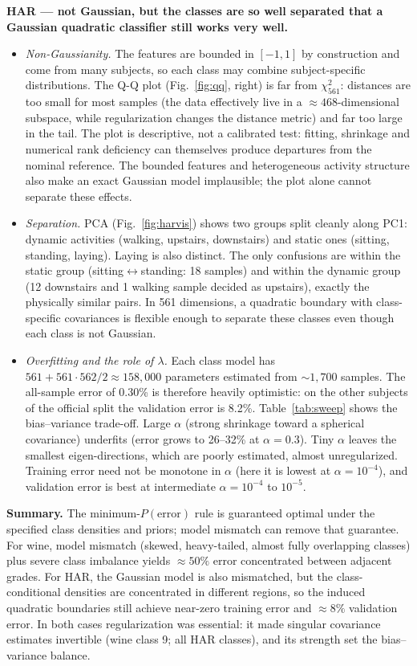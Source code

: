 \documentclass[10pt]{article}
\begin{document}
\textbf{HAR --- not Gaussian, but the classes are so well separated that a Gaussian quadratic classifier still works very well.}
\begin{itemize}
\item \emph{Non-Gaussianity.} The features are bounded in $[-1,1]$ by construction and come from many subjects, so each class may combine subject-specific distributions. The Q-Q plot (Fig.~\ref{fig:qq}, right) is far from $\chi^2_{561}$: distances are too small for most samples (the data effectively live in a $\approx468$-dimensional subspace, while regularization changes the distance metric) and far too large in the tail. The plot is descriptive, not a calibrated test: fitting, shrinkage and numerical rank deficiency can themselves produce departures from the nominal reference. The bounded features and heterogeneous activity structure also make an exact Gaussian model implausible; the plot alone cannot separate these effects.
\item \emph{Separation.} PCA (Fig.~\ref{fig:harvis}) shows two groups split cleanly along PC1: dynamic activities (walking, upstairs, downstairs) and static ones (sitting, standing, laying). Laying is also distinct. The only confusions are within the static group (sitting$\leftrightarrow$standing: 18 samples) and within the dynamic group (12 downstairs and 1 walking sample decided as upstairs), exactly the physically similar pairs. In 561 dimensions, a quadratic boundary with class-specific covariances is flexible enough to separate these classes even though each class is not Gaussian.
\item \emph{Overfitting and the role of $\lambda$.} Each class model has $561+561\cdot562/2\approx158{,}000$ parameters estimated from $\sim1{,}700$ samples. The all-sample error of 0.30\% is therefore heavily optimistic: on the other subjects of the official split the validation error is 8.2\%. Table~\ref{tab:sweep} shows the bias--variance trade-off. Large $\alpha$ (strong shrinkage toward a spherical covariance) underfits (error grows to 26--32\% at $\alpha=0.3$). Tiny $\alpha$ leaves the smallest eigen-directions, which are poorly estimated, almost unregularized. Training error need not be monotone in $\alpha$ (here it is lowest at $\alpha=10^{-4}$), and validation error is best at intermediate $\alpha=10^{-4}$ to $10^{-5}$.
\end{itemize}

\textbf{Summary.} The minimum-$P(\text{error})$ rule is guaranteed optimal under the specified class densities and priors; model mismatch can remove that guarantee. For wine, model mismatch (skewed, heavy-tailed, almost fully overlapping classes) plus severe class imbalance yields $\approx50\%$ error concentrated between adjacent grades. For HAR, the Gaussian model is also mismatched, but the class-conditional densities are concentrated in different regions, so the induced quadratic boundaries still achieve near-zero training error and $\approx8\%$ validation error. In both cases regularization was essential: it made singular covariance estimates invertible (wine class 9; all HAR classes), and its strength set the bias--variance balance.
\end{document}
